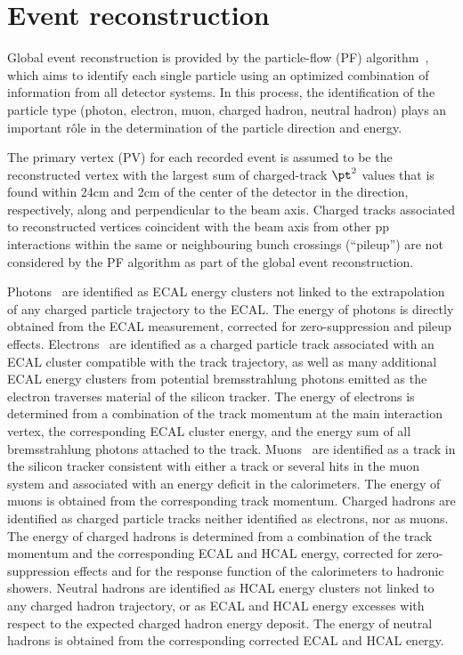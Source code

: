 \section{Event reconstruction}
\label{sec:event_reconstruction}

Global event reconstruction is provided by the particle-flow (PF)
algorithm~\cite{CMS-PAS-PFT-09-001,CMS-PAS-PFT-10-001}, which aims to
identify each single particle using an optimized combination of
information from all detector systems. In this process, the
identification of the particle type (photon, electron, muon, charged
hadron, neutral hadron) plays an important r\^ole in the determination
of the particle direction and energy.

The primary vertex (PV) for each recorded event is assumed to be the
reconstructed vertex with the largest sum of charged-track $\pt^2$
values that is found within 24\unit{cm} and 2\unit{cm} of the center
of the detector in the direction, respectively, along and
perpendicular to the beam axis. Charged tracks associated to
reconstructed vertices coincident with the beam axis from other pp
interactions within the same or neighbouring bunch crossings
(``pileup'') are not considered by the PF algorithm as part of the
global event reconstruction.

Photons~\cite{CMS:EGM-14-001} are identified as ECAL energy clusters
not linked to the extrapolation of any charged particle trajectory to
the ECAL. The energy of photons is directly obtained from the ECAL
measurement, corrected for zero-suppression and pileup effects.
Electrons~\cite{Khachatryan:2015hwa} are identified as a charged
particle track associated with an ECAL cluster compatible with the
track trajectory, as well as many additional ECAL energy clusters from
potential bremsstrahlung photons emitted as the electron traverses
material of the silicon tracker. The energy of electrons is determined
from a combination of the track momentum at the main interaction
vertex, the corresponding ECAL cluster energy, and the energy sum of
all bremsstrahlung photons attached to the track.
Muons~\cite{Chatrchyan:2012xi} are identified as a track in the
silicon tracker consistent with either a track or several hits in the
muon system and associated with an energy deficit in the calorimeters.
The energy of muons is obtained from the corresponding track momentum.
Charged hadrons are identified as charged particle tracks neither
identified as electrons, nor as muons. The energy of charged hadrons
is determined from a combination of the track momentum and the
corresponding ECAL and HCAL energy, corrected for zero-suppression
effects and for the response function of the calorimeters to hadronic
showers. Neutral hadrons are identified as HCAL energy clusters not
linked to any charged hadron trajectory, or as ECAL and HCAL energy
excesses with respect to the expected charged hadron energy deposit.
The energy of neutral hadrons is obtained from the corresponding
corrected ECAL and HCAL energy.

